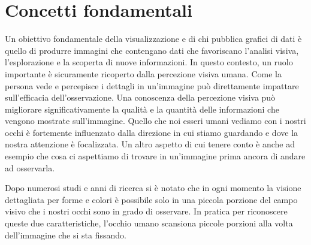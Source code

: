 \documentclass[%
	corpo=12pt,
    twoside,
    stile=classica,
    oldstyle,
    tipotesi=custom,
    greek,
    evenboxes,
]{toptesi}
\begin{document}
{\indici%


%    


\mainmatter


\chapter{Concetti fondamentali}

Un obiettivo fondamentale della visualizzazione e di chi pubblica grafici di dati è quello di produrre immagini che contengano dati che favoriscano l'analisi visiva, l'esplorazione e la scoperta di nuove informazioni. In questo contesto, un ruolo importante è sicuramente ricoperto dalla percezione visiva umana. Come la persona vede e percepisce i dettagli in un'immagine può direttamente impattare sull'efficacia dell'osservazione. Una conoscenza della percezione visiva può migliorare significativamente la qualità e la quantità delle informazioni che vengono mostrate sull'immagine. Quello che noi esseri umani vediamo con i nostri occhi è fortemente influenzato dalla direzione in cui stiamo guardando e dove la nostra attenzione è focalizzata. Un altro aspetto di cui tenere conto è anche ad esempio che cosa ci aspettiamo di trovare in un'immagine prima ancora di andare ad osservarla.

Dopo numerosi studi e anni di ricerca si è notato che in ogni momento la visione dettagliata per forme e colori è possibile solo in una piccola porzione del campo visivo che i nostri occhi sono in grado di osservare. In pratica per riconoscere queste due caratteristiche, l'occhio umano scansiona piccole porzioni alla volta dell'immagine che si sta fissando. 

}
\end{document}
